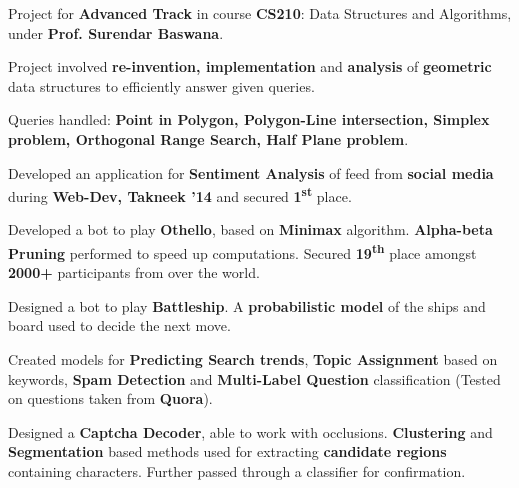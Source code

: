 \documentclass[a4paper]{norm-resume}
\begin{document}
	\vspace{2mm}
	
	   
	\begin{tightitemize}
	\small
	{
	\item Project for \textbf{Advanced Track} in course \textbf{CS210}: Data Structures and Algorithms, under \textbf{Prof. Surendar Baswana}.
	\item Project involved \textbf{re-invention, implementation} and \textbf{analysis} of \textbf{geometric} data structures to efficiently answer given queries.
	\item Queries handled: \textbf{Point in Polygon, Polygon-Line intersection, Simplex problem, Orthogonal Range Search, Half Plane problem}.
	}
	\end{tightitemize}
 		
	\vspace{2mm}
				
			\descript{\null}
	\begin{tightitemize}
	\small
	{
	\item Developed an application for \textbf{Sentiment Analysis} of feed from \textbf{social media} during \textbf{Web-Dev, Takneek '14}  and secured \textbf{1\textsuperscript{st}} place.
	\item Developed a bot to play \textbf{Othello}, based on \textbf{Minimax} algorithm. \textbf{Alpha-beta Pruning} performed to speed up computations. Secured \textbf{19\textsuperscript{th}} place amongst \textbf{2000+} participants from over the world.
	\item Designed a bot to play \textbf{Battleship}. A \textbf{probabilistic model} of the ships and board used to decide the next move.
	\item Created models for \textbf{Predicting Search trends}, \textbf{Topic Assignment} based on keywords, \textbf{Spam Detection} and \textbf{Multi-Label Question} classification (Tested on questions taken from \textbf{Quora}).
	\item Designed a \textbf{Captcha Decoder}, able to work with occlusions. \textbf{Clustering} and \textbf{Segmentation} based methods used for extracting \textbf{candidate regions} containing characters. Further passed through a classifier for confirmation.
	}
	\end{tightitemize}

\vspace{1mm}	%
\end{document}
